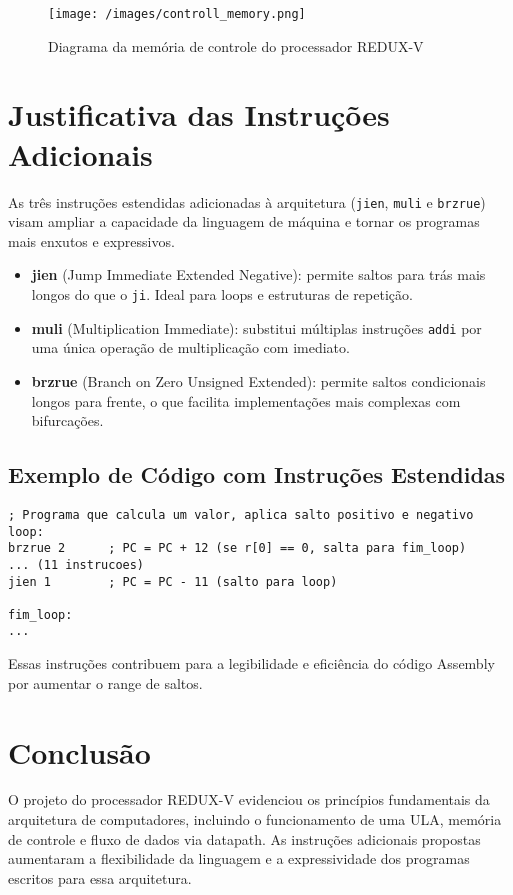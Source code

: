 \documentclass[12pt]{article}
\begin{document}
\begin{figure}[h!]
\centering
\texttt{[image: /images/controll\_memory.png]}
\caption{Diagrama da memória de controle do processador REDUX-V}
\label{fig:memoria_controle}
\end{figure}

\section{Justificativa das Instruções Adicionais}

As três instruções estendidas adicionadas à arquitetura (\texttt{jien}, \texttt{muli} e \texttt{brzrue}) visam ampliar a capacidade da linguagem de máquina e tornar os programas mais enxutos e expressivos.

\begin{itemize}
  \item \textbf{jien} (Jump Immediate Extended Negative): permite saltos para trás mais longos do que o \texttt{ji}. Ideal para loops e estruturas de repetição.
  \item \textbf{muli} (Multiplication Immediate): substitui múltiplas instruções \texttt{addi} por uma única operação de multiplicação com imediato.
  \item \textbf{brzrue} (Branch on Zero Unsigned Extended): permite saltos condicionais longos para frente, o que facilita implementações mais complexas com bifurcações.
\end{itemize}

\subsection{Exemplo de Código com Instruções Estendidas}

\begin{lstlisting}
; Programa que calcula um valor, aplica salto positivo e negativo
loop:
brzrue 2      ; PC = PC + 12 (se r[0] == 0, salta para fim_loop)
... (11 instrucoes)
jien 1        ; PC = PC - 11 (salto para loop)

fim_loop:
...
\end{lstlisting}

Essas instruções contribuem para a legibilidade e eficiência do código Assembly por aumentar o range de saltos.

\section{Conclusão}

O projeto do processador REDUX-V evidenciou os princípios fundamentais da arquitetura de computadores, incluindo o funcionamento de uma ULA, memória de controle e fluxo de dados via datapath. As instruções adicionais propostas aumentaram a flexibilidade da linguagem e a expressividade dos programas escritos para essa arquitetura.
\end{document}
